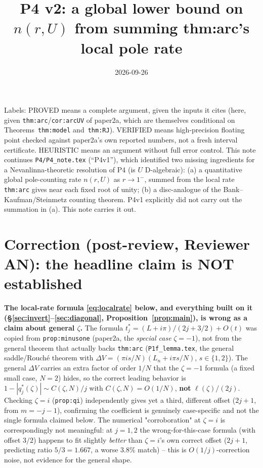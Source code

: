 \documentclass[11pt]{article}
\title{P4 v2: a global lower bound on $n(r,U)$ from summing thm:arc's local pole rate}
\date{2026-09-26}
\theoremstyle{remark}
\begin{document}
\maketitle

\noindent Labels: PROVED means a complete argument, given the inputs it cites (here, given
\texttt{thm:arc}/\texttt{cor:arcUV} of paper2a, which are themselves conditional on
Theorems~\texttt{thm:model} and~\texttt{thm:RJ}). VERIFIED means high-precision floating point
checked against paper2a's own reported numbers, not a fresh interval certificate. HEURISTIC means an
argument without full error control. This note continues \texttt{P4/P4\_note.tex} (``P4v1''), which
identified two missing ingredients for a Nevanlinna-theoretic resolution of P4 (is $U$ D-algebraic):
(a) a quantitative global pole-counting rate $n(r,U)$ as $r\to1^-$, summed from the local rate
\texttt{thm:arc} gives near each fixed root of unity; (b) a disc-analogue of the
Bank--Kaufman/Steinmetz counting theorem. P4v1 explicitly did not carry out the summation in (a). This
note carries it out.

\section*{Correction (post-review, Reviewer AN): the headline claim is NOT established}

\textbf{The local-rate formula \eqref{eq:localrate} below, and everything built on it
(\S\ref{sec:invert}--\ref{sec:diagonal}, Proposition~\ref{prop:main}), is wrong as a claim about
general $\zeta$.} The formula $t^\ast_j=(L+i\pi)/(2j+3/2)+O(t)$ was copied from
\texttt{prop:minusone} (paper2a, the \emph{special case} $\zeta=-1$), not from the general theorem
that actually backs \texttt{thm:arc} (\texttt{P1f\_lemma.tex}, the general saddle/Rouch\'e theorem
with $\Delta V=(\pi is/N)(L_n+i\pi s/N)$, $s\in\{1,2\}$). The general $\Delta V$ carries an extra
factor of order $1/N$ that the $\zeta=-1$ formula (a fixed small case, $N=2$) hides, so the correct
leading behavior is $1-|q^\ast_j(\zeta)|\sim C(\zeta,N)/j$ with $C(\zeta,N)=O(1/N)$, \textbf{not}
$\ell(\zeta)/(2j)$. Checking $\zeta=i$ (\texttt{prop:qi}) independently gives yet a third, different
offset ($2j+1$, from $m=-j-1$), confirming the coefficient is genuinely case-specific and not the
single formula claimed below. The numerical "corroboration" at $\zeta=i$ is correspondingly not
meaningful: at $j=1,2$ the wrong-for-this-case formula (with offset $3/2$) happens to fit slightly
\emph{better} than $\zeta=i$'s own correct offset ($2j+1$, predicting ratio $5/3=1.667$, a worse
$3.8\%$ match) -- this is $O(1/j)$-correction noise, not evidence for the general shape.
\end{document}
